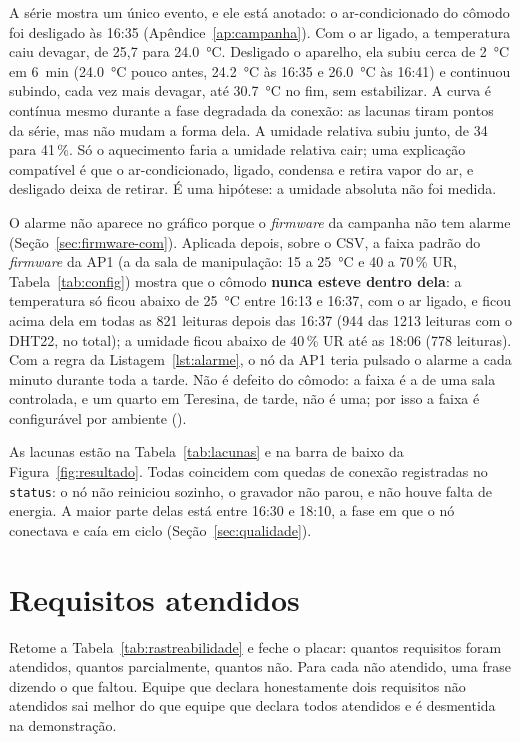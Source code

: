 A série mostra um único evento, e ele está anotado: o ar-condicionado
do cômodo foi desligado às 16:35 (Apêndice~\ref{ap:campanha}). Com o ar
ligado, a temperatura caiu devagar, de 25,7 para \SI{24,0}{\celsius}.
Desligado o aparelho, ela subiu cerca de \SI{2}{\celsius} em
\SI{6}{\minute} (\SI{24,0}{\celsius} pouco antes, \SI{24,2}{\celsius} às
16:35 e \SI{26,0}{\celsius} às 16:41) e
continuou subindo, cada vez mais devagar, até \SI{30,7}{\celsius} no
fim, sem estabilizar. A curva é contínua mesmo durante a fase degradada
da conexão: as lacunas tiram pontos da série, mas não mudam a forma
dela. A umidade relativa subiu junto, de 34 para 41\,\%. Só o
aquecimento faria a umidade relativa cair; uma explicação compatível é
que o ar-condicionado, ligado, condensa e retira vapor do ar, e
desligado deixa de retirar. É uma hipótese: a umidade absoluta não foi
medida.

O alarme não aparece no gráfico porque o \emph{firmware} da campanha não
tem alarme (Seção~\ref{sec:firmware-com}). Aplicada depois, sobre o CSV,
a faixa padrão do \emph{firmware} da AP1 (a da sala de manipulação: 15
a \SI{25}{\celsius} e 40 a 70\,\% UR, Tabela~\ref{tab:config}) mostra
que o cômodo \textbf{nunca esteve dentro dela}: a temperatura só ficou
abaixo de \SI{25}{\celsius} entre 16:13 e 16:37, com o ar ligado, e ficou
acima dela em todas as 821 leituras depois das 16:37 (944 das \num{1213}
leituras com o DHT22, no total); a umidade ficou abaixo de 40\,\% UR até as 18:06 (778
leituras). Com a regra da Listagem~\ref{lst:alarme}, o nó da AP1 teria
pulsado o alarme a cada minuto durante toda a tarde. Não é defeito do
cômodo: a faixa é a de uma sala controlada, e um quarto em Teresina, de
tarde, não é uma; por isso a faixa é configurável por ambiente
().

As lacunas estão na Tabela~\ref{tab:lacunas} e na barra de baixo da
Figura~\ref{fig:resultado}. Todas coincidem com quedas de conexão
registradas no \texttt{status}: o nó não reiniciou sozinho, o gravador
não parou, e não houve falta de energia. A maior parte delas está entre
16:30 e 18:10, a fase em que o nó conectava e caía em ciclo
(Seção~\ref{sec:qualidade}).

\section{Requisitos atendidos}

\begin{orientacao}
Retome a Tabela~\ref{tab:rastreabilidade} e feche o placar: quantos
requisitos foram atendidos, quantos parcialmente, quantos não. Para cada
não atendido, uma frase dizendo o que faltou. Equipe que declara
honestamente dois requisitos não atendidos sai melhor do que equipe que
declara todos atendidos e é desmentida na demonstração.
\end{orientacao}

